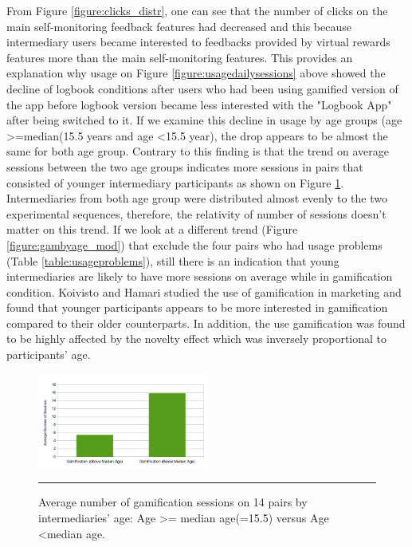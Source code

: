 \documentclass{sig-alternate}
\begin{document}
From Figure \ref{figure:clicks_distr}, one can see that the number of clicks on the main self-monitoring feedback features had decreased and this because intermediary users became interested to feedbacks provided by virtual rewards features more than the main self-monitoring features. This provides an explanation why usage on Figure \ref{figure:usagedailysessions} above showed the decline of logbook conditions  after users who had been using gamified version of the app before logbook version became less interested with the "Logbook App" after being switched to it. If we examine this decline in usage by age groups (age \textgreater=median(15.5 years and age \textless 15.5 year), the drop appears to be almost the same for both age group. Contrary to this finding is that the trend on average sessions between the two age groups indicates more sessions in pairs that consisted of younger intermediary participants as shown on Figure \ref{figure:gambyage}. Intermediaries from both age group were distributed almost evenly to the two experimental sequences, therefore, the relativity of number of sessions doesn't matter on this trend. If we look at a different trend (Figure \ref{figure:gambyage_mod}) that exclude the four pairs who had usage problems (Table \ref{table:usageproblems}), still there is an indication that young intermediaries are likely to have more sessions on average while in gamification condition. Koivisto and Hamari \cite{koivisto2014demographic} studied the use of gamification in marketing and found that younger participants appears to be more interested in gamification compared to their older counterparts. In addition, the use gamification was found to be highly affected by the novelty effect which was inversely proportional to participants' age.\newline\newline
\begin{figure}[htbp]
  \centering
    \includegraphics[width=0.5\textwidth]{gambyage.png}
    \rule{26em}{0.5pt}
  \caption{Average number of gamification sessions on  14 pairs by intermediaries' age: Age \textgreater= median age(=15.5) versus Age \textless median age.}
  \label{figure:gambyage}
\end{figure}\newline
\end{document}
